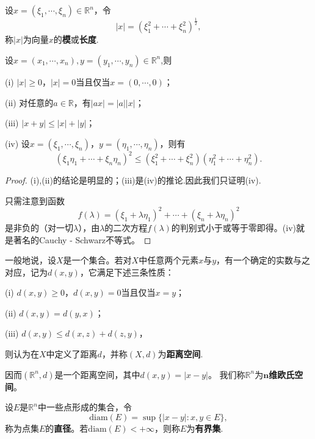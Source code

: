 \documentclass[lang=cn,newtx,10pt,scheme=chinese]{../Template/elegantbook}
\begin{document}
\begin{definition}
设\(x = (\xi_1,\cdots,\xi_n)\in\mathbb{R}^n\)，令
\[|x| = (\xi_1^2+\cdots+\xi_n^2)^{\frac{1}{2}},\]
称\(|x|\)为向量\(x\)的\textbf{模}或\textbf{长度}.
\end{definition}

\begin{proposition}[向量的模的性质]\label{proposition:向量的模的性质}
设\(x=(x_1,\cdots ,x_n),y=\left( y_1,\cdots ,y_n \right) \in \mathbb{R} ^n\),则

(i) \(|x|\geqslant0\)，\(|x| = 0\)当且仅当\(x=(0,\cdots,0)\)；

(ii) 对任意的\(a\in\mathbb{R}\)，有\(|ax| = |a||x|\)；

(iii) \(|x + y|\leqslant|x|+|y|\)；

(iv) 设\(x = (\xi_1,\cdots,\xi_n)\)，\(y = (\eta_1,\cdots,\eta_n)\)，则有
\[(\xi_1\eta_1+\cdots+\xi_n\eta_n)^2\leqslant(\xi_1^2+\cdots+\xi_n^2)(\eta_1^2+\cdots+\eta_n^2).\]
\end{proposition}
\begin{proof}
  (i),(ii)的结论是明显的；(iii)是(iv)的推论.因此我们只证明(iv).

只需注意到函数
\[f(\lambda)=(\xi_1+\lambda\eta_1)^2+\cdots+(\xi_n+\lambda\eta_n)^2\]
是非负的（对一切\(\lambda\)），由\(\lambda\)的二次方程\(f(\lambda)\)的判别式小于或等于零即得。(iv)就是著名的Cauchy - Schwarz不等式。

\end{proof}

\begin{definition}[距离空间]\label{definition:距离空间}
  一般地说，设\(X\)是一个集合。若对\(X\)中任意两个元素\(x\)与\(y\)，有一个确定的实数与之对应，记为\(d(x,y)\)，它满足下述三条性质：

(i) \(d(x,y)\geqslant0\)，\(d(x,y)=0\)当且仅当\(x = y\)；

(ii) \(d(x,y)=d(y,x)\)；

(iii) \(d(x,y)\leqslant d(x,z)+d(z,y)\)，

则认为在\(X\)中定义了距离\(d\)，并称\((X,d)\)为\textbf{距离空间}.
\end{definition}
\begin{note}
  因而\((\mathbb{R}^n,d)\)是一个距离空间，其中\(d(x,y)=|x - y|\)。
我们称\(\mathbb{R}^n\)为\textbf{\(\boldsymbol{n}\)维欧氏空间}。
\end{note}

\begin{definition}[点集的直径与有界集]\label{definition:点集的直径与有界集}
设\(E\)是\(\mathbb{R}^n\)中一些点形成的集合，令
\[\text{diam}(E)=\sup\{|x - y|:x,y\in E\},\]
称为点集\(E\)的\textbf{直径}。若\(\text{diam}(E)<+\infty\)，则称\(E\)为\textbf{有界集}.
\end{definition}
\end{document}
